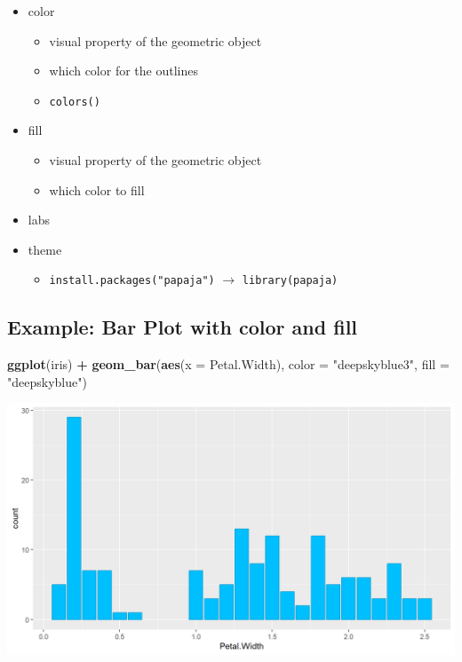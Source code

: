 \documentclass[
]{book}
\newenvironment{Shaded}{\begin{snugshade}}{\end{snugshade}}
\newcommand{\AttributeTok}[1]{\textcolor[rgb]{0.13,0.29,0.53}{#1}}
\newcommand{\FunctionTok}[1]{\textcolor[rgb]{0.13,0.29,0.53}{\textbf{#1}}}
\newcommand{\NormalTok}[1]{#1}
\newcommand{\SpecialCharTok}[1]{\textcolor[rgb]{0.81,0.36,0.00}{\textbf{#1}}}
\newcommand{\StringTok}[1]{\textcolor[rgb]{0.31,0.60,0.02}{#1}}
\providecommand{\tightlist}{%
  \setlength{\itemsep}{0pt}\setlength{\parskip}{0pt}}
\begin{document}
\begin{itemize}
\tightlist
\item
  color

  \begin{itemize}
  \tightlist
  \item
    visual property of the geometric object
  \item
    which color for the outlines
  \item
    \texttt{colors()}
  \end{itemize}
\item
  fill

  \begin{itemize}
  \tightlist
  \item
    visual property of the geometric object
  \item
    which color to fill
  \end{itemize}
\item
  labs
\item
  theme

  \begin{itemize}
  \tightlist
  \item
    \texttt{install.packages("papaja")} \(\rightarrow\) \texttt{library(papaja)}
  \end{itemize}
\end{itemize}

\subsection{Example: Bar Plot with color and fill}\label{example-bar-plot-with-color-and-fill}

\begin{Shaded}
\begin{Highlighting}[]
\FunctionTok{ggplot}\NormalTok{(iris) }\SpecialCharTok{+} 
  \FunctionTok{geom\_bar}\NormalTok{(}\FunctionTok{aes}\NormalTok{(}\AttributeTok{x =}\NormalTok{ Petal.Width), }\AttributeTok{color =} \StringTok{"deepskyblue3"}\NormalTok{, }\AttributeTok{fill =} \StringTok{"deepskyblue"}\NormalTok{)}
\end{Highlighting}
\end{Shaded}

\begin{flushleft}\includegraphics{_main_files/figure-html/unnamed-chunk-32-1} \end{flushleft}
\end{document}
